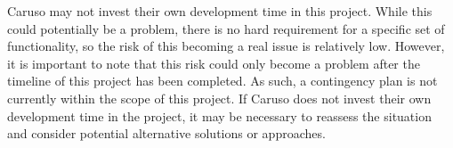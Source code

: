 Caruso may not invest their own development time in this project. While this could potentially be a problem, there is no hard requirement for a specific set of functionality, so the risk of this becoming a real issue is relatively low. However, it is important to note that this risk could only become a problem after the timeline of this project has been completed. As such, a contingency plan is not currently within the scope of this project. If Caruso does not invest their own development time in the project, it may be necessary to reassess the situation and consider potential alternative solutions or approaches.


